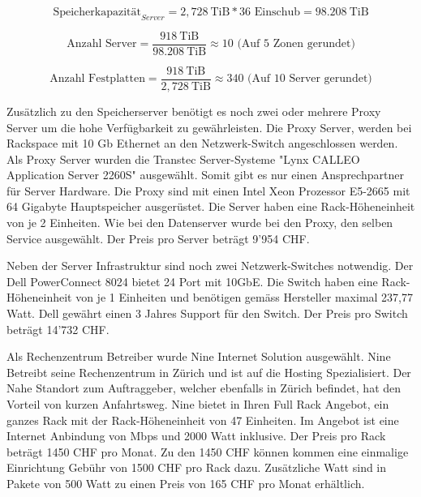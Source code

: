 \begin{equation}
\mbox{Speicherkapazität}_{Server} = 2,728 \mathrm{\ TiB} * 36 \mbox{\ Einschub} =  98.208 \mathrm{\ TiB}
\label{eqn:SpeicherkapazitätServer}
\end{equation}

\begin{equation}
\mbox{Anzahl Server} = \frac{918 \mathrm{\ TiB}}{98.208 \mathrm{\ TiB}} \approx  10 \mbox{\ (Auf 5 Zonen gerundet)}
\label{eqn:AnzahlServer}
\end{equation}

\begin{equation}
\mbox{Anzahl Festplatten} = \frac{918 \mathrm{\ TiB}}{2,728 \mathrm{\ TiB}} \approx  340 \mbox{\ (Auf 10 Server gerundet)}
\label{eqn:AnzahlServer}
\end{equation}

Zusätzlich zu den Speicherserver benötigt es noch zwei oder mehrere Proxy Server um die hohe Verfügbarkeit zu gewährleisten. Die Proxy Server, werden bei Rackspace mit  10 Gb Ethernet an den Netzwerk-Switch angeschlossen werden. \cite{OpenStack2011}
Als Proxy Server wurden die Transtec Server-Systeme "Lynx CALLEO Application Server 2260S" ausgewählt. Somit gibt es nur einen Ansprechpartner für Server Hardware.
Die Proxy sind mit einen Intel Xeon Prozessor E5-2665 mit 64 Gigabyte Hauptspeicher ausgerüstet. Die Server haben eine Rack-Höheneinheit von je 2 Einheiten. Wie bei den Datenserver wurde bei den Proxy, den selben Service ausgewählt. Der Preis pro Server beträgt 9'954 CHF.

Neben der Server Infrastruktur sind noch zwei Netzwerk-Switches notwendig. Der Dell PowerConnect 8024 bietet 24 Port mit 10GbE. Die Switch haben eine Rack-Höheneinheit von je 1 Einheiten und benötigen gemäss Hersteller maximal 237,77 Watt. Dell gewährt einen 3 Jahres Support für den Switch. Der Preis pro Switch beträgt 14'732 CHF.

Als Rechenzentrum Betreiber wurde Nine Internet Solution ausgewählt. Nine Betreibt seine Rechenzentrum in Zürich und ist auf die Hosting Spezialisiert. Der Nahe Standort zum Auftraggeber, welcher ebenfalls in Zürich befindet, hat den Vorteil von kurzen Anfahrtsweg. Nine bietet in Ihren Full Rack Angebot, ein ganzes Rack mit der Rack-Höheneinheit von 47 Einheiten. Im Angebot ist eine Internet Anbindung von Mbps und 2000 Watt inklusive. Der Preis pro Rack beträgt 1450 CHF pro Monat. Zu den 1450 CHF können kommen eine einmalige Einrichtung Gebühr von 1500 CHF pro Rack dazu. Zusätzliche Watt sind in Pakete von 500 Watt zu einen Preis von 165 CHF pro Monat erhältlich.

